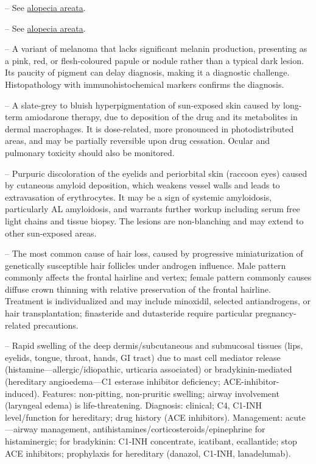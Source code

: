 -- See \hyperlink{Alopecia Areata}{alopecia areata}.

-- See \hyperlink{Alopecia Areata}{alopecia areata}.

-- A variant of melanoma that lacks significant melanin production, presenting as a pink, red, or flesh-coloured papule or nodule rather than a typical dark lesion. Its paucity of pigment can delay diagnosis, making it a diagnostic challenge. Histopathology with immunohistochemical markers confirms the diagnosis.

-- A slate-grey to bluish hyperpigmentation of sun-exposed skin caused by long-term amiodarone therapy, due to deposition of the drug and its metabolites in dermal macrophages. It is dose-related, more pronounced in photodistributed areas, and may be partially reversible upon drug cessation. Ocular and pulmonary toxicity should also be monitored.

-- Purpuric discoloration of the eyelids and periorbital skin (raccoon eyes) caused by cutaneous amyloid deposition, which weakens vessel walls and leads to extravasation of erythrocytes. It may be a sign of systemic amyloidosis, particularly AL amyloidosis, and warrants further workup including serum free light chains and tissue biopsy. The lesions are non-blanching and may extend to other sun-exposed areas.

-- The most common cause of hair loss, caused by progressive miniaturization of genetically susceptible hair follicles under androgen influence. Male pattern commonly affects the frontal hairline and vertex; female pattern commonly causes diffuse crown thinning with relative preservation of the frontal hairline. Treatment is individualized and may include minoxidil, selected antiandrogens, or hair transplantation; finasteride and dutasteride require particular pregnancy-related precautions.

-- Rapid swelling of the deep dermis/subcutaneous and submucosal tissues (lips, eyelids, tongue, throat, hands, GI tract) due to mast cell mediator release (histamine—allergic/idiopathic, urticaria associated) or bradykinin-mediated (hereditary angioedema—C1 esterase inhibitor deficiency; ACE-inhibitor-induced). Features: non-pitting, non-pruritic swelling; airway involvement (laryngeal edema) is life-threatening. Diagnosis: clinical; C4, C1-INH level/function for hereditary; drug history (ACE inhibitors). Management: acute—airway management, antihistamines/corticosteroids/epinephrine for histaminergic; for bradykinin: C1-INH concentrate, icatibant, ecallantide; stop ACE inhibitors; prophylaxis for hereditary (danazol, C1-INH, lanadelumab).

